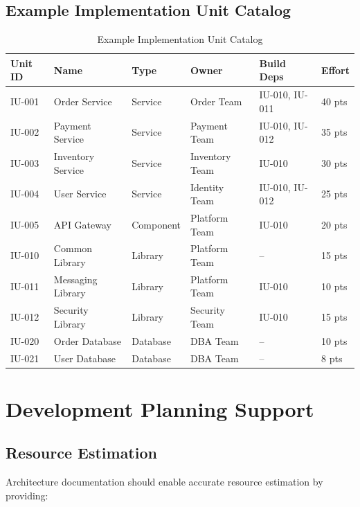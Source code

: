 \documentclass[11pt]{article}
\begin{document}
\subsection{Example Implementation Unit Catalog}

\begin{longtable}{@{}L{2cm} L{2.5cm} L{2.5cm} L{2cm} L{2cm} L{1.5cm}@{}}
\caption{Example Implementation Unit Catalog} \\
\toprule
\textbf{Unit ID} & \textbf{Name} & \textbf{Type} & \textbf{Owner} & \textbf{Build Deps} & \textbf{Effort} \\
\midrule
\endfirsthead
\bottomrule
\endlastfoot
IU-001 & Order Service & Service & Order Team & IU-010, IU-011 & 40 pts \\
IU-002 & Payment Service & Service & Payment Team & IU-010, IU-012 & 35 pts \\
IU-003 & Inventory Service & Service & Inventory Team & IU-010 & 30 pts \\
IU-004 & User Service & Service & Identity Team & IU-010, IU-012 & 25 pts \\
IU-005 & API Gateway & Component & Platform Team & IU-010 & 20 pts \\
IU-010 & Common Library & Library & Platform Team & -- & 15 pts \\
IU-011 & Messaging Library & Library & Platform Team & IU-010 & 10 pts \\
IU-012 & Security Library & Library & Security Team & IU-010 & 15 pts \\
IU-020 & Order Database & Database & DBA Team & -- & 10 pts \\
IU-021 & User Database & Database & DBA Team & -- & 8 pts \\
\end{longtable}

\section{Development Planning Support}

\subsection{Resource Estimation}

Architecture documentation should enable accurate resource estimation by providing:
\end{document}
